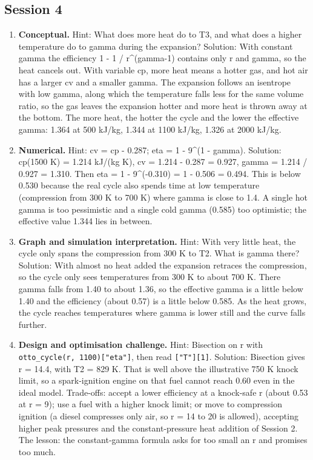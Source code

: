 \documentclass[11pt,a4paper]{article}
\begin{document}
\subsection*{Session 4}
\begin{enumerate}[nosep]
\item \textbf{Conceptual.} Hint: What does more heat do to T3, and what does a higher temperature do to gamma during the expansion? Solution: With constant gamma the efficiency 1 - 1 / r\textasciicircum{}(gamma-1) contains only r and gamma, so the heat cancels out. With variable cp, more heat means a hotter gas, and hot air has a larger cv and a smaller gamma. The expansion follows an isentrope with low gamma, along which the temperature falls less for the same volume ratio, so the gas leaves the expansion hotter and more heat is thrown away at the bottom. The more heat, the hotter the cycle and the lower the effective gamma: 1.364 at 500 kJ/kg, 1.344 at 1100 kJ/kg, 1.326 at 2000 kJ/kg.
\item \textbf{Numerical.} Hint: cv = cp - 0.287; eta = 1 - 9\textasciicircum{}(1 - gamma). Solution: cp(1500 K) = 1.214 kJ/(kg K), cv = 1.214 - 0.287 = 0.927, gamma = 1.214 / 0.927 = 1.310. Then eta = 1 - 9\textasciicircum{}(-0.310) = 1 - 0.506 = 0.494. This is below 0.530 because the real cycle also spends time at low temperature (compression from 300 K to 700 K) where gamma is close to 1.4. A single hot gamma is too pessimistic and a single cold gamma (0.585) too optimistic; the effective value 1.344 lies in between.
\item \textbf{Graph and simulation interpretation.} Hint: With very little heat, the cycle only spans the compression from 300 K to T2. What is gamma there? Solution: With almost no heat added the expansion retraces the compression, so the cycle only sees temperatures from 300 K to about 700 K. There gamma falls from 1.40 to about 1.36, so the effective gamma is a little below 1.40 and the efficiency (about 0.57) is a little below 0.585. As the heat grows, the cycle reaches temperatures where gamma is lower still and the curve falls further.
\item \textbf{Design and optimisation challenge.} Hint: Bisection on r with \texttt{otto\_cycle(r, 1100)["eta"]}, then read \texttt{["T"][1]}. Solution: Bisection gives r = 14.4, with T2 = 829 K. That is well above the illustrative 750 K knock limit, so a spark-ignition engine on that fuel cannot reach 0.60 even in the ideal model. Trade-offs: accept a lower efficiency at a knock-safe r (about 0.53 at r = 9); use a fuel with a higher knock limit; or move to compression ignition (a diesel compresses only air, so r = 14 to 20 is allowed), accepting higher peak pressures and the constant-pressure heat addition of Session 2. The lesson: the constant-gamma formula asks for too small an r and promises too much.
\end{enumerate}
\end{document}
